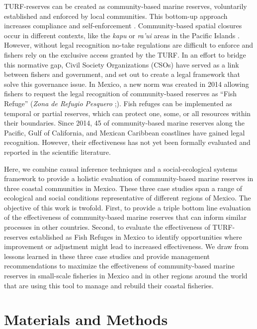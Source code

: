 \documentclass{frontiersSCNS}
\theoremstyle{definition}
\theoremstyle{definition}
\theoremstyle{definition}
\theoremstyle{remark}
\begin{document}
TURF-reserves can be created as community-based marine reserves,
voluntarily established and enforced by local communities. This
bottom-up approach increases compliance and self-enforcement
\citep{gelcich_2015-Gw,espinosaromero_2014-PY,beger_2004-Y8}.
Community-based spatial closures occur in different contexts, like the
\emph{kapu} or \emph{ra'ui} areas in the Pacific Islands
\citep{bohnsack_2004,johannes_2002}. However, without legal recognition
no-take regulations are difficult to enforce and fishers rely on the
exclusive access granted by the TURF. In an effort to bridge this
normative gap, Civil Society Organizations (CSOs) have served as a link
between fishers and government, and set out to create a legal framework
that solve this governance issue. In Mexico, a new norm was created in
2014 allowing fishers to request the legal recognition of
community-based reserves as ``Fish Refuge'' (\emph{Zona de Refugio
Pesquero} ;\citet{nom}). Fish refuges can be implemented as temporal or
partial reserves, which can protect one, some, or all resources within
their boundaries. Since 2014, 45 of community-based marine reserves
along the Pacific, Gulf of California, and Mexican Caribbean coastlines
have gained legal recognition. However, their effectiveness has not yet
been formally evaluated and reported in the scientific literature.

Here, we combine causal inference techniques and a social-ecological
systems framework to provide a holistic evaluation of community-based
marine reserves in three coastal communities in Mexico. These three case
studies span a range of ecological and social conditions representative
of different regions of Mexico. The objective of this work is twofold.
First, to provide a triple bottom line evaluation of the effectiveness
of community-based marine reserves that can inform similar processes in
other countries. Second, to evaluate the effectiveness of TURF-reserves
established as Fish Refuges in Mexico to identify opportunities where
improvement or adjustment might lead to increased effectiveness. We draw
from lessons learned in these three case studies and provide management
recommendations to maximize the effectiveness of community-based marine
reserves in small-scale fisheries in Mexico and in other regions around
the world that are using this tool to manage and rebuild their coastal
fisheries.

\section{Materials and Methods}\label{materials-and-methods}
\end{document}
